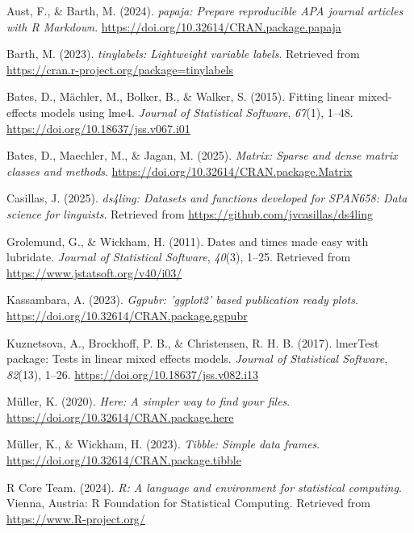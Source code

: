 \documentclass[
  ,man,floatsintext]{apa6}
\newlength{\cslhangindent}
\newenvironment{CSLReferences}[2] %
 {\begin{list}{}{%
  \setlength{\itemindent}{0pt}
  \setlength{\leftmargin}{0pt}
  \setlength{\parsep}{0pt}
  \ifodd #1
   \setlength{\leftmargin}{\cslhangindent}
   \setlength{\itemindent}{-1\cslhangindent}
  \fi
  \setlength{\itemsep}{#2\baselineskip}}}
 {\end{list}}
\begin{document}
\label{refs}
\begin{CSLReferences}{1}{0}
Aust, F., \& Barth, M. (2024). \emph{{papaja}: {Prepare} reproducible {APA} journal articles with {R Markdown}}. \url{https://doi.org/10.32614/CRAN.package.papaja}

Barth, M. (2023). \emph{{tinylabels}: Lightweight variable labels}. Retrieved from \url{https://cran.r-project.org/package=tinylabels}

Bates, D., Mächler, M., Bolker, B., \& Walker, S. (2015). Fitting linear mixed-effects models using {lme4}. \emph{Journal of Statistical Software}, \emph{67}(1), 1--48. \url{https://doi.org/10.18637/jss.v067.i01}

Bates, D., Maechler, M., \& Jagan, M. (2025). \emph{Matrix: Sparse and dense matrix classes and methods}. \url{https://doi.org/10.32614/CRAN.package.Matrix}

Casillas, J. (2025). \emph{ds4ling: Datasets and functions developed for SPAN658: Data science for linguists}. Retrieved from \url{https://github.com/jvcasillas/ds4ling}

Grolemund, G., \& Wickham, H. (2011). Dates and times made easy with {lubridate}. \emph{Journal of Statistical Software}, \emph{40}(3), 1--25. Retrieved from \url{https://www.jstatsoft.org/v40/i03/}

Kassambara, A. (2023). \emph{Ggpubr: 'ggplot2' based publication ready plots}. \url{https://doi.org/10.32614/CRAN.package.ggpubr}

Kuznetsova, A., Brockhoff, P. B., \& Christensen, R. H. B. (2017). {lmerTest} package: Tests in linear mixed effects models. \emph{Journal of Statistical Software}, \emph{82}(13), 1--26. \url{https://doi.org/10.18637/jss.v082.i13}

Müller, K. (2020). \emph{Here: A simpler way to find your files}. \url{https://doi.org/10.32614/CRAN.package.here}

Müller, K., \& Wickham, H. (2023). \emph{Tibble: Simple data frames}. \url{https://doi.org/10.32614/CRAN.package.tibble}

R Core Team. (2024). \emph{R: A language and environment for statistical computing}. Vienna, Austria: R Foundation for Statistical Computing. Retrieved from \url{https://www.R-project.org/}


\end{CSLReferences}
\end{document}
